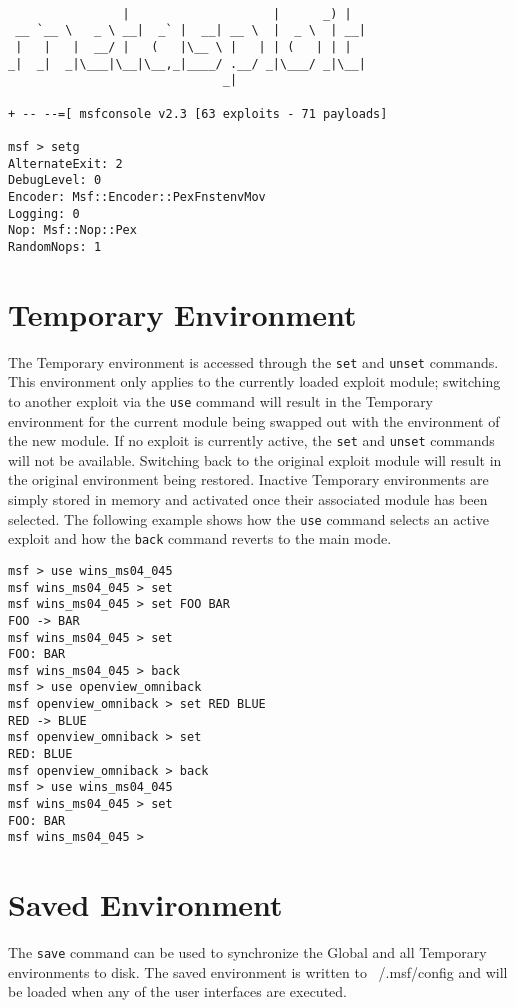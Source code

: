 \documentclass{report}
\begin{document}
\begin{verbatim}

                |                    |      _) |
 __ `__ \   _ \ __|  _` |  __| __ \  |  _ \  | __|
 |   |   |  __/ |   (   |\__ \ |   | | (   | | |
_|  _|  _|\___|\__|\__,_|____/ .__/ _|\___/ _|\__|
                              _|

+ -- --=[ msfconsole v2.3 [63 exploits - 71 payloads]

msf > setg
AlternateExit: 2
DebugLevel: 0
Encoder: Msf::Encoder::PexFnstenvMov
Logging: 0
Nop: Msf::Nop::Pex
RandomNops: 1
\end{verbatim}


    \section{Temporary Environment}
    \label{ENV-TEMP}
\par

The Temporary environment is accessed through the \texttt{set} and
\texttt{unset} commands. This environment only applies to the currently loaded
exploit module; switching to another exploit via the \texttt{use} command will
result in the Temporary environment for the current module being swapped out
with the environment of the new module. If no exploit is currently active, the
\texttt{set} and \texttt{unset} commands will not be available. Switching back
to the original exploit module will result in the original environment being
restored. Inactive Temporary environments are simply stored in memory and
activated once their associated module has been selected. The following example
shows how the \texttt{use} command selects an active exploit and how the
\texttt{back} command reverts to the main mode.  

\begin{verbatim}
msf > use wins_ms04_045
msf wins_ms04_045 > set
msf wins_ms04_045 > set FOO BAR
FOO -> BAR
msf wins_ms04_045 > set
FOO: BAR
msf wins_ms04_045 > back
msf > use openview_omniback
msf openview_omniback > set RED BLUE
RED -> BLUE
msf openview_omniback > set
RED: BLUE
msf openview_omniback > back
msf > use wins_ms04_045
msf wins_ms04_045 > set
FOO: BAR
msf wins_ms04_045 >
\end{verbatim}


    \section{Saved Environment}
    \label{ENV-SAVE}
\par
The \texttt{save} command can be used to synchronize the Global and all
Temporary environments to disk. The saved environment is written to
~/.msf/config and will be loaded when any of the user interfaces are executed.  
\end{document}
